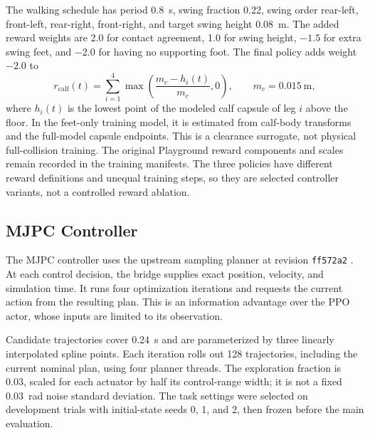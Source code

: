 \documentclass[conference]{IEEEtran}
\begin{document}
The walking schedule has period 0.8~s, swing fraction 0.22, swing order rear-left, front-left, rear-right, front-right, and target swing height 0.08~m. The added reward weights are 2.0 for contact agreement, 1.0 for swing height, $-1.5$ for extra swing feet, and $-2.0$ for having no supporting foot. The final policy adds weight $-2.0$ to
\begin{equation}
r_{\mathrm{calf}}(t)=\sum_{i=1}^{4}\max\!\left(\frac{m_c-h_i(t)}{m_c},0\right),\qquad m_c=0.015~\mathrm{m},
\label{eq:calf}
\end{equation}
where $h_i(t)$ is the lowest point of the modeled calf capsule of leg $i$ above the floor. In the feet-only training model, it is estimated from calf-body transforms and the full-model capsule endpoints. This is a clearance surrogate, not physical full-collision training. The original Playground reward components and scales remain recorded in the training manifests. The three policies have different reward definitions and unequal training steps, so they are selected controller variants, not a controlled reward ablation.

\subsection{MJPC Controller}

The MJPC controller uses the upstream sampling planner at revision \texttt{ff572a2} \cite{mjpc}. At each control decision, the bridge supplies exact position, velocity, and simulation time. It runs four optimization iterations and requests the current action from the resulting plan. This is an information advantage over the PPO actor, whose inputs are limited to its observation.

Candidate trajectories cover 0.24~s and are parameterized by three linearly interpolated spline points. Each iteration rolls out 128 trajectories, including the current nominal plan, using four planner threads. The exploration fraction is 0.03, scaled for each actuator by half its control-range width; it is not a fixed 0.03~rad noise standard deviation. The task settings were selected on development trials with initial-state seeds 0, 1, and 2, then frozen before the main evaluation.
\end{document}
